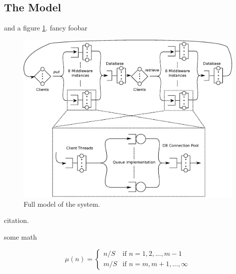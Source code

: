 \subsection{The Model}
and a figure \ref{fig:full_model}.  fancy foobar

\begin{figure}[h!]
\centering
\includegraphics[width=1\textwidth]{figures/full_model.eps}
\caption{Full model of the system.}
\label{fig:full_model}
\end{figure}

\newpage

citation\cite{lz77}. 

some math

\[\mu(n) =
\left\{
	\begin{array}{ll}
		n/S  & \mbox{if } n=1,2,...,m-1 \\
		m/S & \mbox{if } n=m,m+1,...,\infty
	\end{array}
\right.
 \]


